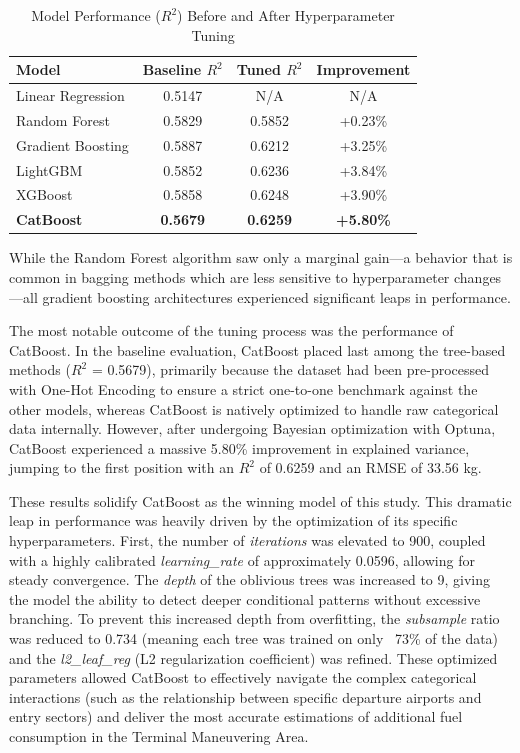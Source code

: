 \begin{table}[htbp]
\caption{Model Performance ($R^2$) Before and After Hyperparameter Tuning}
\label{tab:tuning_results}
\centering
\begin{tabular}{lccc}
\hline
\textbf{Model} & \textbf{Baseline $R^2$} & \textbf{Tuned $R^2$} & \textbf{Improvement} \\
\hline
Linear Regression & 0.5147 & N/A & N/A \\
Random Forest & 0.5829 & 0.5852 & +0.23\% \\
Gradient Boosting & 0.5887 & 0.6212 & +3.25\% \\
LightGBM & 0.5852 & 0.6236 & +3.84\% \\
XGBoost & 0.5858 & 0.6248 & +3.90\% \\
\textbf{CatBoost} & \textbf{0.5679} & \textbf{0.6259} & \textbf{+5.80\%} \\
\hline
\end{tabular}
\end{table}

While the Random Forest algorithm saw only a marginal gain—a behavior that is common in bagging methods which are less sensitive to hyperparameter changes—all gradient boosting architectures experienced significant leaps in performance.

The most notable outcome of the tuning process was the performance of CatBoost. In the baseline evaluation, CatBoost placed last among the tree-based methods ($R^2$ = 0.5679), primarily because the dataset had been pre-processed with One-Hot Encoding to ensure a strict one-to-one benchmark against the other models, whereas CatBoost is natively optimized to handle raw categorical data internally. However, after undergoing Bayesian optimization with Optuna, CatBoost experienced a massive 5.80\% improvement in explained variance, jumping to the first position with an $R^2$ of 0.6259 and an RMSE of 33.56 kg.

These results solidify CatBoost as the winning model of this study. This dramatic leap in performance was heavily driven by the optimization of its specific hyperparameters. First, the number of \textit{iterations} was elevated to 900, coupled with a highly calibrated \textit{learning\_rate} of approximately 0.0596, allowing for steady convergence. The \textit{depth} of the oblivious trees was increased to 9, giving the model the ability to detect deeper conditional patterns without excessive branching. To prevent this increased depth from overfitting, the \textit{subsample} ratio was reduced to 0.734 (meaning each tree was trained on only ~73\% of the data) and the \textit{l2\_leaf\_reg} (L2 regularization coefficient) was refined. These optimized parameters allowed CatBoost to effectively navigate the complex categorical interactions (such as the relationship between specific departure airports and entry sectors) and deliver the most accurate estimations of additional fuel consumption in the Terminal Maneuvering Area.

